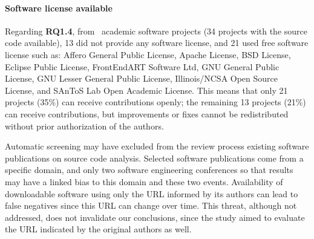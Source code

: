 \paragraph{\bf Software license available}
Regarding \textbf{RQ1.4},
from \SoftwareCount \ academic software projects
(34 projects with the source code available),
13 did not provide any software license,
and 21 used free software license such as:
Affero General Public License,
Apache License,
BSD License,
Eclipse Public License,
FrontEndART Software Ltd,
GNU General Public License,
GNU Lesser General Public License,
Illinois/NCSA Open Source License, and
SAnToS Lab Open Academic License.
%
This means that only 21 projects (35\%) can receive contributions openly;
the remaining 13 projects (21\%) can receive contributions,
but improvements or fixes cannot be redistributed without prior authorization of
the authors.

%
Automatic screening may have excluded from the review process existing software
publications on source code analysis. Selected software publications come from
a specific domain,  and only two software engineering conferences so that
results may have a linked bias to this domain and these two events.
Availability of downloadable software using only the URL informed by its
authors can lead to false negatives since this URL can change over time. This
threat, although not addressed, does not invalidate our conclusions,  since the
study aimed to evaluate the URL indicated by the original authors as well.
